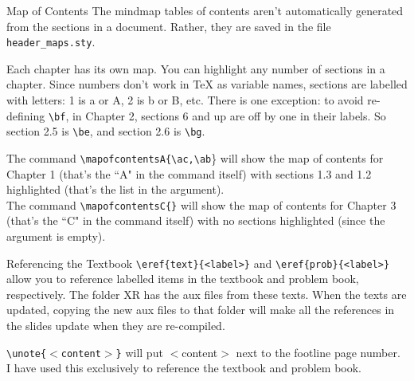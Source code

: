 \documentclass[10pt]{beamer}
\begin{document}
\begin{frame}[t]{Map of Contents}
The mindmap tables of contents aren't automatically generated from the sections in a document. Rather, they are saved in the file \texttt{header\_maps.sty}.\vfill

Each chapter has its own map. You can highlight any number of sections in a chapter. Since numbers don't work in TeX as variable names, sections are labelled with letters: 1 is a or A, 2 is b or B, etc. There is one exception: to avoid re-defining \texttt{\textbackslash bf}, in Chapter 2, sections 6 and up are off by one in their labels. So section 2.5 is \texttt{\textbackslash be}, and section 2.6 is \texttt{\textbackslash bg}.
\vfill

The command \texttt{\textbackslash mapofcontentsA\{\textbackslash ac,\textbackslash ab}\} will show the map of contents for Chapter 1 (that's the ``A" in the command itself) with sections 1.3 and 1.2 highlighted (that's the list in the argument). \\

The command \texttt{\textbackslash mapofcontentsC\{\}} will show the map of contents for Chapter 3 (that's the ``C" in the command itself) with no sections highlighted (since the argument is empty).\\

\end{frame}

\begin{frame}[fragile]{Referencing the Textbook}
\verb|\eref{text}{<label>}| and \verb|\eref{prob}{<label>}| allow you to reference labelled items in the textbook and problem book, respectively. The folder XR has the aux files from these texts. When the texts are updated, copying the new aux files to that folder will make all the references in the slides update when they are re-compiled.
\vfill

\texttt{\textbackslash unote\{$<$content$>$\}} will put $<$content$>$ next to the footline page number. I have used this exclusively to reference the textbook and problem book.
\end{frame}
\end{document}
